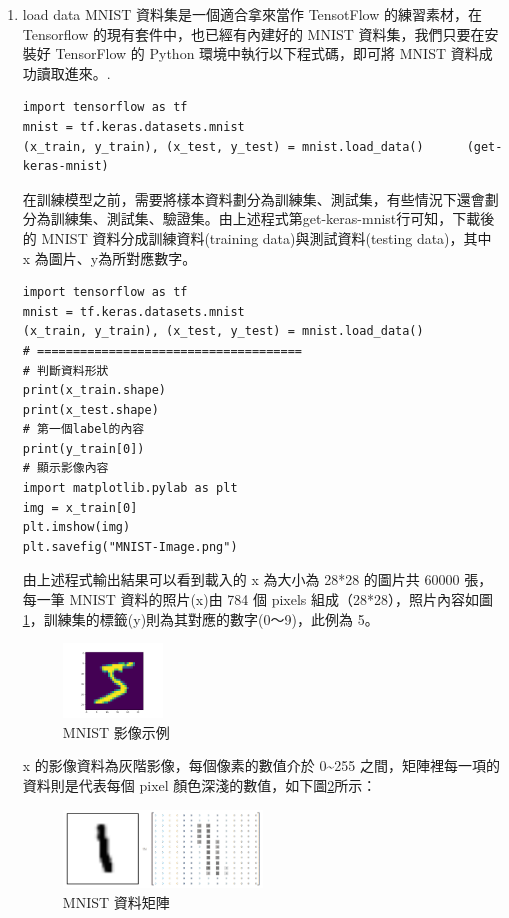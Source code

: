 \documentclass[a4paper,12pt]{article}
\begin{document}
\begin{enumerate}
\item load data
\label{sec:orge5dc1a1}
MNIST 資料集是一個適合拿來當作 TensotFlow 的練習素材，在 Tensorflow 的現有套件中，也已經有內建好的 MNIST 資料集，我們只要在安裝好 TensorFlow 的 Python 環境中執行以下程式碼，即可將 MNIST 資料成功讀取進來。.\\
\lstset{breaklines=true,language=Python,label= ,caption= ,captionpos=b,numbers=none}
\begin{lstlisting}
import tensorflow as tf
mnist = tf.keras.datasets.mnist
(x_train, y_train), (x_test, y_test) = mnist.load_data()      (get-keras-mnist)
\end{lstlisting}
在訓練模型之前，需要將樣本資料劃分為訓練集、測試集，有些情況下還會劃分為訓練集、測試集、驗證集。由上述程式第get-keras-mnist行可知，下載後的 MNIST 資料分成訓練資料(training data)與測試資料(testing data)，其中 x 為圖片、y為所對應數字。\\
\lstset{breaklines=true,language=Python,label= ,caption= ,captionpos=b,numbers=none}
\begin{lstlisting}
import tensorflow as tf
mnist = tf.keras.datasets.mnist
(x_train, y_train), (x_test, y_test) = mnist.load_data()
# =====================================
# 判斷資料形狀
print(x_train.shape)
print(x_test.shape)
# 第一個label的內容
print(y_train[0])
# 顯示影像內容
import matplotlib.pylab as plt
img = x_train[0]
plt.imshow(img)
plt.savefig("MNIST-Image.png")
\end{lstlisting}
由上述程式輸出結果可以看到載入的 x 為大小為 28*28 的圖片共 60000 張，每一筆 MNIST 資料的照片(x)由 784 個 pixels 組成（28*28），照片內容如圖\ref{fig:MNIST-Image}，訓練集的標籤(y)則為其對應的數字(0～9)，此例為 5。\\
\begin{figure}[htbp]
\centering
\includegraphics[width=100px]{images/MNIST-Image.png}
\caption{\label{fig:MNIST-Image}MNIST 影像示例}
\end{figure}

x 的影像資料為灰階影像，每個像素的數值介於 0\textasciitilde{}255 之間，矩陣裡每一項的資料則是代表每個 pixel 顏色深淺的數值，如下圖\ref{fig:MNIST-Matrix}所示：\\
\begin{figure}[htbp]
\centering
\includegraphics[width=200]{images/MNIST-Matrix.png}
\caption{\label{fig:MNIST-Matrix}MNIST 資料矩陣}
\end{figure}


\end{enumerate}
\end{document}
